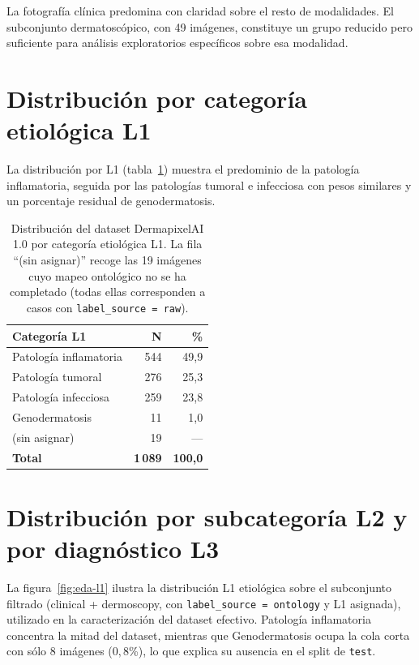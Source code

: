 La fotografía clínica predomina con claridad sobre el resto de
modalidades. El subconjunto dermatoscópico, con 49 imágenes,
constituye un grupo reducido pero suficiente para análisis
exploratorios específicos sobre esa modalidad.

\section{Distribución por categoría etiológica L1}
\label{sec:anexo-l1}

La distribución por L1 (tabla~\ref{tab:anexo-l1}) muestra el
predominio de la patología inflamatoria, seguida por las patologías
tumoral e infecciosa con pesos similares y un porcentaje residual de
genodermatosis.

\begin{table}[H]
\centering
\small
\caption{Distribución del dataset DermapixelAI 1.0 por categoría
etiológica L1. La fila ``(sin asignar)'' recoge las 19 imágenes cuyo
mapeo ontológico no se ha completado (todas ellas corresponden a
casos con \texttt{label\_source = raw}).}
\label{tab:anexo-l1}
\begin{tabular}{lrr}
\hline
Categoría L1               & N       & \%      \\
\hline
Patología inflamatoria     & 544     & 49,9    \\
Patología tumoral          & 276     & 25,3    \\
Patología infecciosa       & 259     & 23,8    \\
Genodermatosis             & 11      & 1,0     \\
(sin asignar)              & 19      & ---     \\
\hline
\textbf{Total}             & \textbf{1\,089} & \textbf{100,0} \\
\hline
\end{tabular}
\end{table}

\section{Distribución por subcategoría L2 y por diagnóstico L3}
\label{sec:anexo-l2-l3}

La figura~\ref{fig:eda-l1} ilustra la distribución L1 etiológica
sobre el subconjunto filtrado (clinical + dermoscopy, con
\texttt{label\_source = ontology} y L1 asignada), utilizado en la
caracterización del dataset efectivo. Patología inflamatoria
concentra la mitad del dataset, mientras que Genodermatosis ocupa la
cola corta con sólo $8$ imágenes ($0{,}8$\%), lo que explica su
ausencia en el split de \texttt{test}.

